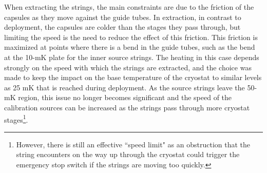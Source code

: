 When extracting the strings, the main constraints are due to the friction of the capsules as they move against the guide tubes.
In extraction, in contrast to deployment, the capsules are colder than the stages they pass through, but limiting the speed is the need to reduce the effect of this friction.
This friction is maximized at points where there is a bend in the guide tubes, such as the bend at the 10-mK plate for the inner source strings.
The heating in this case depends strongly on the speed with which the strings are extracted, and the choice was made to keep the impact on the base temperature of the cryostat to similar levels as 25 mK that is reached during deployment.
As the source strings leave the 50-mK region, this issue no longer becomes significant and the speed of the calibration sources can be increased as the strings pass through more cryostat stages\footnote{However, there is still an effective ``speed limit" as an obstruction that the string encounters on the way up through the cryostat could trigger the emergency stop switch if the strings are moving too quickly.}.

